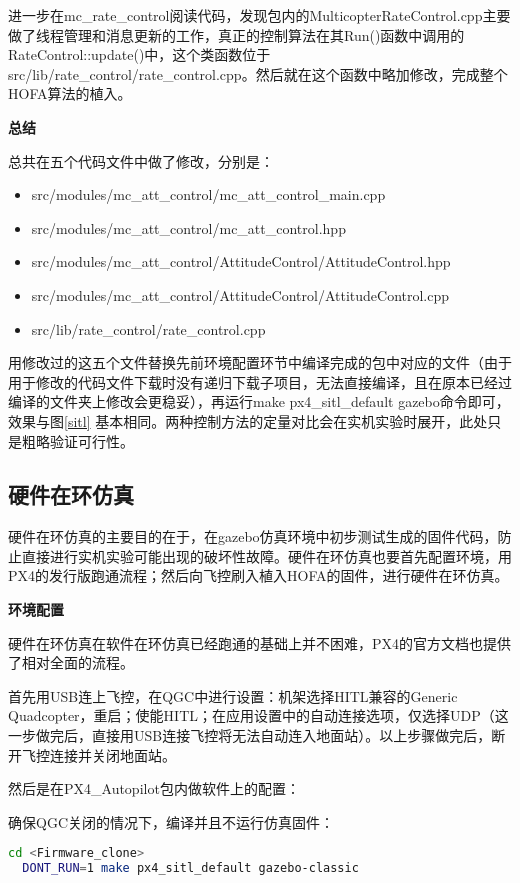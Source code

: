 进一步在mc\_rate\_control阅读代码，发现包内的MulticopterRateControl.cpp主要做了线程管理和消息更新的工作，真正的控制算法在其Run()函数中调用的RateControl::update()中，这个类函数位于src/lib/rate\_control/rate\_control.cpp。然后就在这个函数中略加修改，完成整个HOFA算法的植入。

\textbf{总结}

总共在五个代码文件中做了修改，分别是：
\begin{itemize}
  \item src/modules/mc\_att\_control/mc\_att\_control\_main.cpp
  \item src/modules/mc\_att\_control/mc\_att\_control.hpp
  \item src/modules/mc\_att\_control/AttitudeControl/AttitudeControl.hpp
  \item src/modules/mc\_att\_control/AttitudeControl/AttitudeControl.cpp
  \item src/lib/rate\_control/rate\_control.cpp
\end{itemize}

用修改过的这五个文件替换先前环境配置环节中编译完成的包中对应的文件（由于用于修改的代码文件下载时没有递归下载子项目，无法直接编译，且在原本已经过编译的文件夹上修改会更稳妥），再运行make px4\_sitl\_default gazebo命令即可，效果与图\ref{sitl} 基本相同。两种控制方法的定量对比会在实机实验时展开，此处只是粗略验证可行性。

\subsection{硬件在环仿真}
硬件在环仿真的主要目的在于，在gazebo仿真环境中初步测试生成的固件代码，防止直接进行实机实验可能出现的破坏性故障。硬件在环仿真也要首先配置环境，用PX4的发行版跑通流程；然后向飞控刷入植入HOFA的固件，进行硬件在环仿真。

\textbf{环境配置}

硬件在环仿真在软件在环仿真已经跑通的基础上并不困难，PX4的官方文档也提供了相对全面的流程\cite{px4hitl}。

首先用USB连上飞控，在QGC中进行设置：机架选择HITL兼容的Generic Quadcopter，重启；使能HITL；在应用设置中的自动连接选项，仅选择UDP（这一步做完后，直接用USB连接飞控将无法自动连入地面站）。以上步骤做完后，断开飞控连接并关闭地面站。

然后是在PX4\_Autopilot包内做软件上的配置\cite{px4hitl}：

确保QGC关闭的情况下，编译并且不运行仿真固件：
\begin{lstlisting}[language=Bash, basicstyle=\footnotesize, linewidth=\linewidth, breaklines=true]
  cd <Firmware_clone>
  DONT_RUN=1 make px4_sitl_default gazebo-classic
\end{lstlisting}

